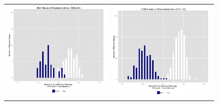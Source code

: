 \documentclass[a4paper, 12pt]{article}
\begin{document}
\begin{figure}[!ht]
    \centering
    \begin{tabular}{cc}
    \includegraphics{images/Picture1.png} & \includegraphics{images/Picture2.png} \\

\end{tabular}
\end{figure}
\end{document}
